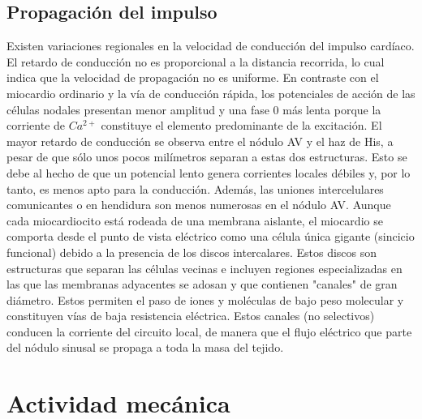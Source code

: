 \subsection{Propagación del impulso} \label{subsec:pulse-propagation}

\indent Existen variaciones regionales en la velocidad de conducción del impulso cardíaco. \\
\indent El retardo de conducción no es proporcional a la distancia recorrida, lo cual indica que la velocidad de
propagación no es uniforme. En contraste con el miocardio ordinario y la vía de conducción rápida, los potenciales
de acción de las células nodales presentan menor amplitud y una fase 0 más lenta porque la corriente de $Ca^{2+}$
constituye el elemento predominante de la excitación. El mayor retardo de conducción se observa entre el nódulo AV y
el haz de His, a pesar de que sólo unos pocos milímetros separan a estas dos estructuras. Esto se debe al hecho de
que un potencial lento genera corrientes locales débiles y, por lo tanto, es menos apto para la conducción. Además,
las uniones intercelulares comunicantes o en hendidura son menos numerosas en el nódulo AV. Aunque cada
miocardiocito está rodeada de una membrana aislante, el miocardio se comporta desde el punto de vista eléctrico como
una célula única gigante (sincicio funcional) debido a la presencia de los discos intercalares. Estos discos son
estructuras que separan las células vecinas e incluyen regiones especializadas en las que las membranas adyacentes
se adosan y que contienen "canales" de gran diámetro. Estos permiten el paso de iones y moléculas de bajo peso
molecular y constituyen vías de baja resistencia eléctrica. Estos canales (no selectivos) conducen la corriente del
circuito local, de manera que el flujo eléctrico que parte del nódulo sinusal se propaga a toda la masa del tejido.

\section{Actividad mecánica} \label{sec:mechanical-activity}


